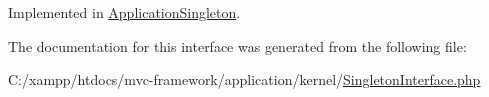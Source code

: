Implemented in \hyperlink{class_application_singleton_ac93fbec81f07e5d15f80db907e63dc10}{Application\+Singleton}.



The documentation for this interface was generated from the following file\+:\begin{DoxyCompactItemize}
\item 
C\+:/xampp/htdocs/mvc-\/framework/application/kernel/\hyperlink{_singleton_interface_8php}{Singleton\+Interface.\+php}\end{DoxyCompactItemize}
